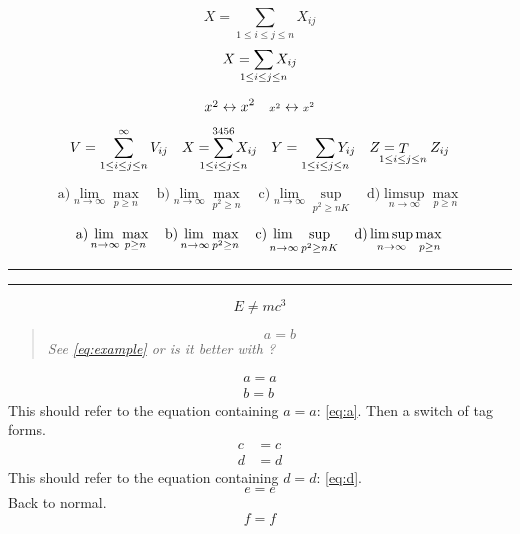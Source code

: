 \documentclass{article}
\newcommand{\horz}{\noindent\makebox[\linewidth]{\rule{\paperwidth}{0.4pt}}}
\begin{document}
\[
X = \sum_{1\le i\le j\le n} X_{ij}
\]
\[
X = \sum_{\mathclap{1\le i\le j\le n}} X_{ij}
\]

\horz

\[
\cramped{x^2} \leftrightarrow x^2 \quad
\cramped[\scriptstyle]{x^2} \leftrightarrow {\scriptstyle x^2}
\]

\horz

\[
V = \sum_{1\le i\le j\le n}^{\infty} V_{ij} \quad
X = \smashoperator{\sum_{1\le i\le j\le n}^{3456}} X_{ij} \quad
Y = \smashoperator[r]{\sum\limits_{1\le i\le j\le n}} Y_{ij} \quad
Z = \smashoperator[l]{\mathop{T}_{1\le i\le j\le n}} Z_{ij}
\]

\horz

\[
\text{a)} \lim_{n\to\infty} \max_{p\ge n} \quad
\text{b)} \lim_{n\to\infty} \max_{p^2\ge n} \quad
\text{c)} \lim_{n\to\infty} \sup_{p^2\ge nK} \quad
\text{d)} \limsup_{n\to\infty} \max_{p\ge n}
\]

\[
\text{a)} \adjustlimits\lim_{n\to\infty} \max_{p\ge n} \quad
\text{b)} \adjustlimits\lim_{n\to\infty} \max_{p^2\ge n} \quad
\text{c)} \adjustlimits\lim_{n\to\infty} \sup_{p^2\ge nK} \quad
\text{d)} \adjustlimits\limsup_{n\to\infty} \max_{p\ge n}
\]

\horz

\noindent\rule\textwidth{1pt}
\begin{align*} A &= B \end{align*}
\noindent\rule\textwidth{1pt}
\begin{align*}
\SwapAboveDisplaySkip
A &= B
\end{align*}

\horz

\begin{equation}
E \neq m c^3
\end{equation}

\horz

\begin{quote}\renewcommand*\rmdefault{ppl}\normalfont\itshape
\begin{equation*}
a=b \label{eq:example}\tag*{Q\&A}
\end{equation*}
See \ref{eq:example} or is it better with ?
\end{quote}

\horz

\begin{gather}
a=a \label{eq:a} \\
b=b \label{eq:b} \tag{**}
\end{gather}
This should refer to the equation containing $a=a$: \eqref{eq:a}.
Then a switch of tag forms.
\begin{align}
c&=c \label{eq:c} \\
d&=d \label{eq:d}
\end{align}
This should refer to the equation containing $d=d$: \eqref{eq:d}.
\begin{equation}
e=e
\end{equation}
Back to normal.
\begin{equation}
f=f
\end{equation}
\end{document}
